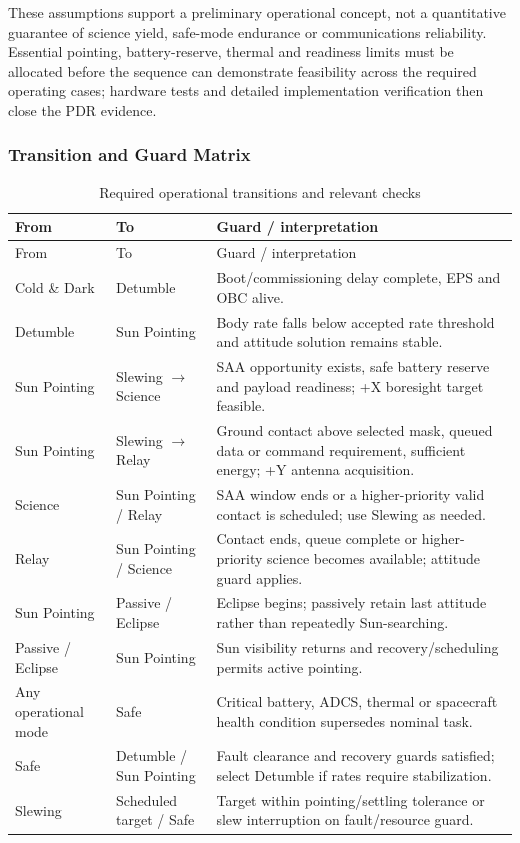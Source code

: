 These assumptions support a preliminary operational concept, not a quantitative guarantee of science yield, safe-mode endurance or communications reliability. Essential pointing, battery-reserve, thermal and readiness limits must be allocated before the sequence can demonstrate feasibility across the required operating cases; hardware tests and detailed implementation verification then close the PDR evidence.

\subsubsection{Transition and Guard Matrix}\label{app:op-logic-matrix}
\begin{longtable}{@{}p{2.25cm}p{2.55cm}p{6.9cm}@{}}
\caption{Required operational transitions and relevant checks}\label{tab:op-transition-matrix}\\\toprule
From & To & Guard / interpretation\\\midrule\endfirsthead\toprule From & To & Guard / interpretation\\\midrule\endhead
Cold \& Dark & Detumble & Boot/commissioning delay complete, EPS and OBC alive.\\
Detumble & Sun Pointing & Body rate falls below accepted rate threshold and attitude solution remains stable.\\
Sun Pointing & Slewing $\to$ Science & SAA opportunity exists, safe battery reserve and payload readiness; +X boresight target feasible.\\
Sun Pointing & Slewing $\to$ Relay & Ground contact above selected mask, queued data or command requirement, sufficient energy; +Y antenna acquisition.\\
Science & Sun Pointing / Relay & SAA window ends or a higher-priority valid contact is scheduled; use Slewing as needed.\\
Relay & Sun Pointing / Science & Contact ends, queue complete or higher-priority science becomes available; attitude guard applies.\\
Sun Pointing & Passive / Eclipse & Eclipse begins; passively retain last attitude rather than repeatedly Sun-searching.\\
Passive / Eclipse & Sun Pointing & Sun visibility returns and recovery/scheduling permits active pointing.\\
Any operational mode & Safe & Critical battery, ADCS, thermal or spacecraft health condition supersedes nominal task.\\
Safe & Detumble / Sun Pointing & Fault clearance and recovery guards satisfied; select Detumble if rates require stabilization.\\
Slewing & Scheduled target / Safe & Target within pointing/settling tolerance or slew interruption on fault/resource guard.\\\bottomrule\end{longtable}

